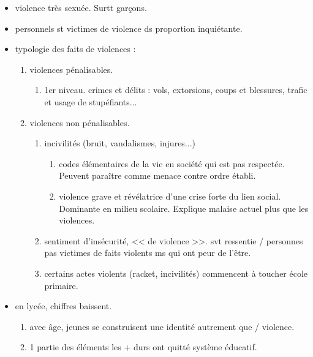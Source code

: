 \documentclass[12pt]{report}
\begin{document}
\begin{itemize}
\begin{itemize}
\item violence très sexuée. Surtt garçons.\\

\item  personnels st victimes de violence ds proportion inquiétante.\\

\item typologie des faits de violences : 
\begin{enumerate}
\item violences pénalisables.
\begin{enumerate}
\item 1er niveau. crimes et délits : vols, extorsions, coups et blessures, trafic et usage de stupéfiants...\\
\end{enumerate}
\item violences non pénalisables.
\begin{enumerate}
\item incivilités (bruit, vandalismes, injures...)
\begin{enumerate}
\item codes élémentaires de la vie en société qui est pas respectée. Peuvent paraître comme menace contre ordre établi. \\
\item violence grave et révélatrice d'une crise forte du lien social. Dominante en milieu scolaire. Explique malaise actuel plus que les violences.\\
\end{enumerate}

\item sentiment d'insécurité, << de violence >>. svt ressentie / personnes pas victimes de faits violents ms qui ont peur de l'être.\\

\item certains actes violents (racket, incivilités) commencent à toucher école primaire.\\

\end{enumerate}
\end{enumerate}

\item en lycée, chiffres baissent.\\
\begin{enumerate}
\item avec âge, jeunes se construisent une identité autrement que / violence.\\
\item 1 partie des éléments les + durs ont quitté système éducatif.\\
\end{enumerate}


\end{itemize}
\end{itemize}
\end{document}

